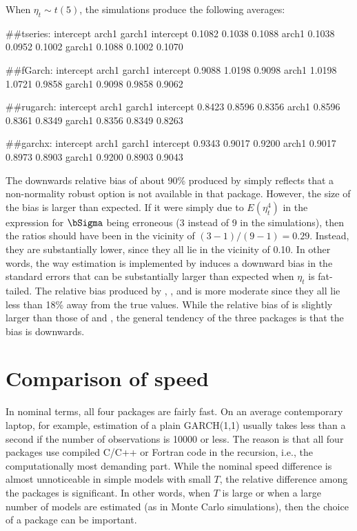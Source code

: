 When $\eta_t\sim t(5)$, the simulations produce the following averages:
%
\begin{example}
	##tseries:
	          intercept  arch1 garch1
	intercept    0.1082 0.1038 0.1088
	arch1        0.1038 0.0952 0.1002
	garch1       0.1088 0.1002 0.1070
		
	##fGarch:
	          intercept  arch1 garch1
	intercept    0.9088 1.0198 0.9098
	arch1        1.0198 1.0721 0.9858
	garch1       0.9098 0.9858 0.9062
	
	##rugarch:
	          intercept  arch1 garch1
	intercept    0.8423 0.8596 0.8356
	arch1        0.8596 0.8361 0.8349
	garch1       0.8356 0.8349 0.8263
	
	##garchx:
	          intercept  arch1 garch1
	intercept    0.9343 0.9017 0.9200
	arch1        0.9017 0.8973 0.8903
	garch1       0.9200 0.8903 0.9043
\end{example}
%
The downwards relative bias of about 90\% produced by  simply reflects that a non-normality robust option is not available in that package. However, the size of the bias is larger than expected. If it were simply due to $E(\eta_t^4)$ in the expression for $\bSigma$ being erroneous (3 instead of 9 in the simulations), then the ratios should have been in the vicinity of $(3-1)/(9-1) = 0.29$. Instead, they are substantially lower, since they all lie in the vicinity of 0.10. In other words, the way estimation is implemented by  induces a downward bias in the standard errors that can be substantially larger than expected when $\eta_t$ is fat-tailed. The relative bias produced by , , and  is more moderate since they all lie less than 18\% away from the true values. While the relative bias of  is slightly larger than those of  and , the general tendency of the three packages is that the bias is downwards.

\section{Comparison of speed}

In nominal terms, all four packages are fairly fast. On an average contemporary laptop, for example, estimation of a plain GARCH(1,1) usually takes less than a second if the number of observations is 10000 or less. The reason is that all four packages use compiled C/C++ or Fortran code in the recursion, i.e., the computationally most demanding part. While the nominal speed difference is almost unnoticeable in simple models with small $T$, the relative difference among the packages is significant. In other words, when $T$ is large or when a large number of models are estimated (as in Monte Carlo simulations), then the choice of a package can be important.

